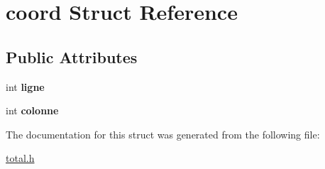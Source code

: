 \hypertarget{structcoord}{}\section{coord Struct Reference}
\label{structcoord}
\subsection*{Public Attributes}
\begin{DoxyCompactItemize}
\item 
int {\bfseries ligne}\hypertarget{structcoord_a14248b4ad4d3e3876c178ada4b75c3e2}{}\label{structcoord_a14248b4ad4d3e3876c178ada4b75c3e2}

\item 
int {\bfseries colonne}\hypertarget{structcoord_aaf2792c9216ee9a08bfbb7b92adbbb7e}{}\label{structcoord_aaf2792c9216ee9a08bfbb7b92adbbb7e}

\end{DoxyCompactItemize}


The documentation for this struct was generated from the following file\+:\begin{DoxyCompactItemize}
\item 
\hyperlink{total_8h}{total.\+h}\end{DoxyCompactItemize}
